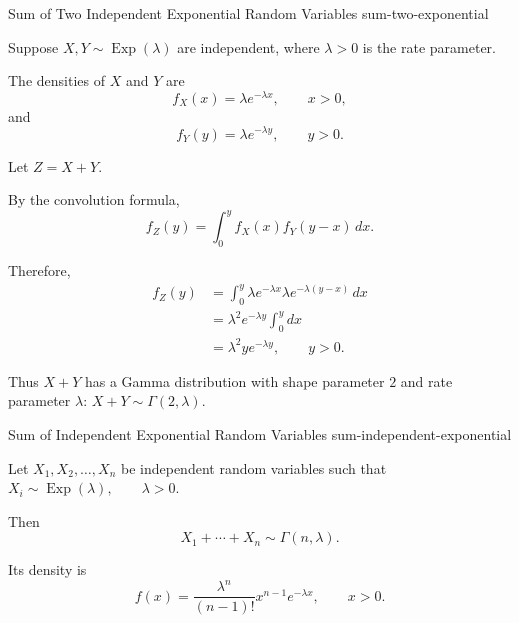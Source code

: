 \begin{example}{Sum of Two Independent Exponential Random Variables}
{sum-two-exponential}

Suppose
\(
X,Y\sim\operatorname{Exp}(\lambda)
\)
are independent, where $\lambda>0$ is the rate parameter.

The densities of $X$ and $Y$ are
\[
f_X(x)=\lambda e^{-\lambda x},
\qquad x>0,
\]
and
\[
f_Y(y)=\lambda e^{-\lambda y},
\qquad y>0.
\]

Let
\(
Z=X+Y.
\)

By the convolution formula,
\[
f_Z(y)
=
\int_0^y
f_X(x)f_Y(y-x)\,dx.
\]

Therefore,
\[
\begin{aligned}
f_Z(y)
&=
\int_0^y
\lambda e^{-\lambda x}
\lambda e^{-\lambda(y-x)}
\,dx\\
&=
\lambda^2e^{-\lambda y}
\int_0^y dx\\
&=
\lambda^2y e^{-\lambda y},
\qquad y>0.
\end{aligned}
\]

Thus
\(
X+Y
\)
has a Gamma distribution with shape parameter $2$ and rate
parameter $\lambda$:
\(
X+Y\sim\Gamma(2,\lambda).
\)

\end{example}



\begin{proposition}{Sum of Independent Exponential Random Variables}
{sum-independent-exponential}

Let
\(
X_1,X_2,\ldots,X_n
\)
be independent random variables such that
\(
X_i\sim\operatorname{Exp}(\lambda),
\qquad
\lambda>0.
\)

Then
\[
X_1+\cdots+X_n
\sim
\Gamma(n,\lambda).
\]

Its density is
\[
f(x)
=
\frac{\lambda^n}{(n-1)!}
x^{n-1}e^{-\lambda x},
\qquad x>0.
\]

\end{proposition}

